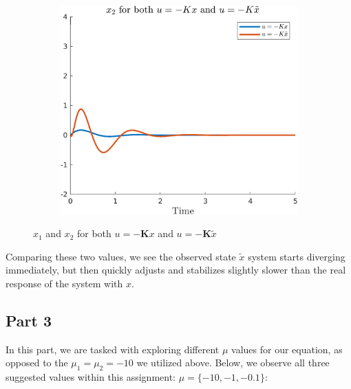 \documentclass{article}
\begin{document}
\begin{figure}[H]
\begin{subfigure}{0.325\textwidth}
        \includegraphics[width = \textwidth]{figures/c2-x2-plot.png}
    \end{subfigure}
    \caption{$x_1$ and $x_2$ for both $u = -\boldsymbol{K}x$ and $u = -\boldsymbol{K}\tilde{x}$}
    \label{fig:c-1_results}
\end{figure}

Comparing these two values, we see the observed state $\tilde{x}$ system starts diverging immediately, but then quickly adjusts and stabilizes slightly slower than the real response of the system with $x$.

\subsection*{Part 3}

In this part, we are tasked with exploring different $\mu$ values for our equation, as opposed to the $\mu_1 = \mu_2 = -10$ we utilized above. Below, we observe all three suggested values within this assignment: $\mu = \{ -10, -1, -0.1\}$:
\end{document}
